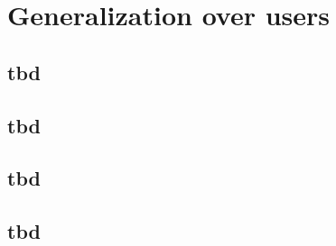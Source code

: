 
\section{Generalization over users}\label{ord:ch5:sec3}



\subsection{tbd}\label{ord:ch5:sec3:subsec1}

\subsection{tbd}\label{ord:ch5:sec3:subsec2}

\subsection{tbd}\label{ord:ch5:sec3:subsec3}

\subsection{tbd}\label{ord:ch5:sec3:subsec4}
